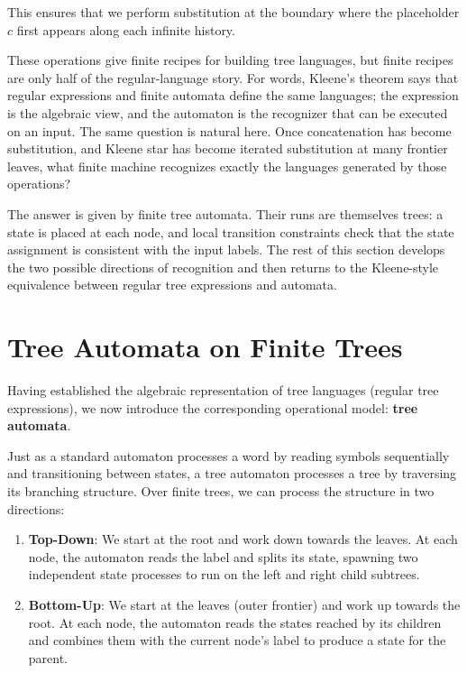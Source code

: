 This ensures that we perform substitution at the boundary where the placeholder $c$ first appears along each infinite history.

These operations give finite recipes for building tree languages, but finite recipes are only half of the regular-language story. For words, Kleene's theorem says that regular expressions and finite automata define the same languages; the expression is the algebraic view, and the automaton is the recognizer that can be executed on an input. The same question is natural here. Once concatenation has become substitution, and Kleene star has become iterated substitution at many frontier leaves, what finite machine recognizes exactly the languages generated by those operations?

The answer is given by finite tree automata. Their runs are themselves trees: a state is placed at each node, and local transition constraints check that the state assignment is consistent with the input labels. The rest of this section develops the two possible directions of recognition and then returns to the Kleene-style equivalence between regular tree expressions and automata.

\section{Tree Automata on Finite Trees}
\label{sec:tree-automata-finite}

Having established the algebraic representation of tree languages (regular tree expressions), we now introduce the corresponding operational model: \textbf{tree automata}.

Just as a standard automaton processes a word by reading symbols sequentially and transitioning between states, a tree automaton processes a tree by traversing its branching structure. Over finite trees, we can process the structure in two directions:
\begin{enumerate}
    \item \textbf{Top-Down}: We start at the root and work down towards the leaves. At each node, the automaton reads the label and splits its state, spawning two independent state processes to run on the left and right child subtrees.
    \item \textbf{Bottom-Up}: We start at the leaves (outer frontier) and work up towards the root. At each node, the automaton reads the states reached by its children and combines them with the current node's label to produce a state for the parent.
\end{enumerate}

